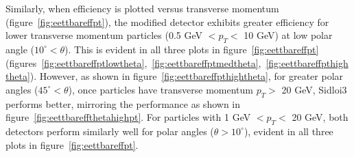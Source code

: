 Similarly, when efficiency is plotted versus transverse momentum (figure~\ref{fig:eettbareffpt}), the modified detector
exhibits greater efficiency for lower transverse momentum particles (0.5 GeV $< p_{T} <$ 10 GeV) at low polar angle ($10^{\circ} < \theta$).
This is evident in all three plots in figure~\ref{fig:eettbareffpt}
 (figures~\ref{fig:eettbareffptlowtheta},~\ref{fig:eettbareffptmedtheta},~\ref{fig:eettbareffpthightheta}).
However, as shown in figure~\ref{fig:eettbareffpthightheta}, 
for greater polar angles ($45^{\circ} < \theta$), once particles have transverse momentum $p_{T} > $ 20 GeV,
Sidloi3 performs better, mirroring the performance as shown in figure~\ref{fig:eettbareffthetahighpt}.
For particles with 1 GeV $< p_{T}<$ 20 GeV, both detectors perform
similarly well for polar angles  ($\theta > 10^{\circ}$), evident in all three plots in figure~\ref{fig:eettbareffpt}.
